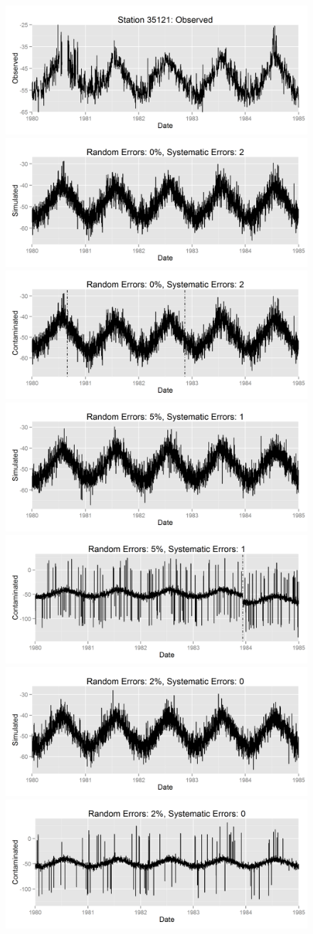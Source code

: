 \documentclass[12pt]{article}
\begin{document}
\begin{figure}
	\centering
	\includegraphics[width=.9\textwidth]{35121_time_series.png}\\
	\includegraphics[width=.45\textwidth]{35121_simulated_1.png}
	\includegraphics[width=.45\textwidth]{35121_contaminated_1.png}\\
	\includegraphics[width=.45\textwidth]{35121_simulated_2.png}
	\includegraphics[width=.45\textwidth]{35121_contaminated_2.png}\\
	\includegraphics[width=.45\textwidth]{35121_simulated_3.png}
	\includegraphics[width=.45\textwidth]{35121_contaminated_3.png}\\

\end{figure}
\end{document}
